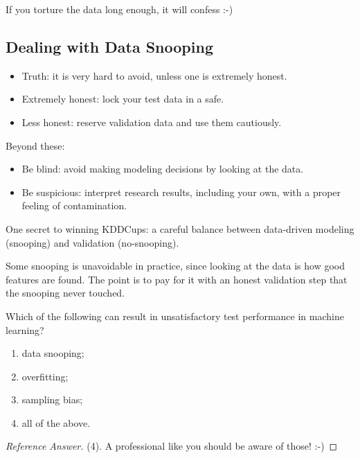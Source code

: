 \begin{moral}
    If you torture the data long enough, it will confess :-)
\end{moral}

\subsection{Dealing with Data Snooping}

\begin{itemize}
    \item Truth: it is very hard to avoid, unless one is extremely honest.
    \item Extremely honest: lock your test data in a safe.
    \item Less honest: reserve validation data and use them cautiously.
\end{itemize}
Beyond these:
\begin{itemize}
    \item Be blind: avoid making modeling decisions by looking at the data.
    \item Be suspicious: interpret research results, including your own, with
        a proper feeling of contamination.
\end{itemize}

\begin{moral}
    One secret to winning KDDCups: a careful balance between data-driven
    modeling (snooping) and validation (no-snooping).
\end{moral}

Some snooping is unavoidable in practice, since looking at the data is how
good features are found. The point is to pay for it with an honest
validation step that the snooping never touched.

\begin{exercise}
    Which of the following can result in unsatisfactory test performance in
    machine learning?
    \begin{enumerate}[(1)]
        \item data snooping;
        \item overfitting;
        \item sampling bias;
        \item all of the above.
    \end{enumerate}
\end{exercise}

\begin{proof}[Reference Answer]
    (4). A professional like you should be aware of those! :-)
\end{proof}

